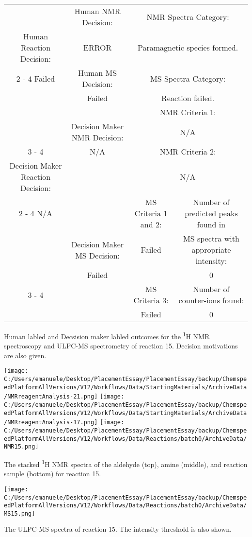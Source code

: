\documentclass{article}%
\begin{document}
\begin{Decision Table}[H]%
\begin{tabular}{|c|c|c|c|}%
\hline%
&Human NMR Decision:&\multicolumn{2}{|c|}{NMR Spectra Category:}\\%
Human Reaction Decision:&ERROR&\multicolumn{2}{|c|}{Paramagnetic species formed.}\\%
\cline{2%
-%
4}%
Failed&Human MS Decision:&\multicolumn{2}{|c|}{MS Spectra Category:}\\%
&Failed&\multicolumn{2}{|c|}{Reaction failed.}\\%
\hline%
&&\multicolumn{2}{|c|}{NMR Criteria 1:}\\%
&Decision Maker NMR Decision:&\multicolumn{2}{|c|}{N/A}\\%
\cline{3%
-%
4}%
&N/A&\multicolumn{2}{|c|}{NMR Criteria 2:}\\%
Decision Maker Reaction Decision:&&\multicolumn{2}{|c|}{N/A}\\%
\cline{2%
-%
4}%
N/A&&MS Criteria 1 and 2:&Number of predicted peaks found in\\%
&Decision Maker MS Decision:&Failed&MS spectra with appropriate intensity:\\%
&Failed&&0\\%
\cline{3%
-%
4}%
&&MS Criteria 3:&Number of counter{-}ions found:\\%
&&Failed&0\\%
\hline%
\end{tabular}%
\caption{Human labled and Decsision maker labled outcomes for the \textsuperscript{1}H NMR spectroscopy and ULPC-MS spectrometry of reaction 15. Decision motivations are also given.}%
\end{Decision Table}%
\begin{NMR Spectra}[H]%
\begin{center}%
\texttt{[image: C:/Users/emanuele/Desktop/PlacementEssay/PlacementEssay/backup/ChemspeedPlatformAllVersions/V12/Workflows/Data/StartingMaterials/ArchiveData/NMRreagentAnalysis-21.png]}\hfill%
\texttt{[image: C:/Users/emanuele/Desktop/PlacementEssay/PlacementEssay/backup/ChemspeedPlatformAllVersions/V12/Workflows/Data/StartingMaterials/ArchiveData/NMRreagentAnalysis-17.png]}\hfill%
\texttt{[image: C:/Users/emanuele/Desktop/PlacementEssay/PlacementEssay/backup/ChemspeedPlatformAllVersions/V12/Workflows/Data/Reactions/batch0/ArchiveData/NMR15.png]}\hfill%
\end{center}%
\caption{The stacked \textsuperscript{1}H NMR spectra of the aldehyde (top), amine (middle), and reaction sample (bottom) for reaction 15.}%
\end{NMR Spectra}%
\begin{MS Spectra}[H]%
\begin{center}%
\texttt{[image: C:/Users/emanuele/Desktop/PlacementEssay/PlacementEssay/backup/ChemspeedPlatformAllVersions/V12/Workflows/Data/Reactions/batch0/ArchiveData/MS15.png]}\hfill%
\end{center}%
\caption{The ULPC-MS spectra of reaction 15. The intensity threshold is also shown.}%
\end{MS Spectra}%
\end{document}
